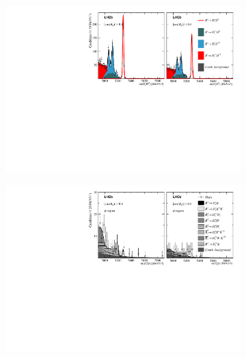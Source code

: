 \begin{figure}[!h]
    \centering
    \begin{subfigure}[t]{1.0\textwidth}
        \centering
        \includegraphics[width=1.0\textwidth]{figs/Appendix_FitCategories/canvas_DsD0_Ds2PhiPi_both_summed_splitHel_splitKKPi_s21_s21r1_s24_s26.pdf}\\
    \end{subfigure}
    \begin{subfigure}[t]{1.0\textwidth}
        \centering
        \includegraphics[width=1.0\textwidth]{figs/Appendix_FitCategories/canvas_DsPhi_Ds2PhiPi_both_summed_splitHel_splitKKPi_s21_s21r1_s24_s26.pdf}\\

\end{subfigure}
\end{figure}
